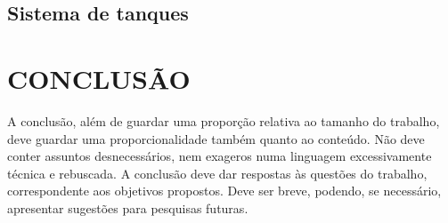 \documentclass[a4paper,12pt]{article}
\begin{document}

\newpage
\subsection{Sistema de tanques}

\newpage


\thispagestyle{main}

\section{CONCLUSÃO}


\hspace{4ex}A conclusão, além de guardar uma proporção relativa ao tamanho do trabalho,
deve guardar uma proporcionalidade também quanto ao conteúdo. Não deve conter
assuntos desnecessários, nem exageros numa linguagem excessivamente técnica e
rebuscada. A conclusão deve dar respostas às questões do trabalho, correspondente aos
objetivos propostos. Deve ser breve, podendo, se necessário, apresentar sugestões para
pesquisas futuras.

\newpage




\appendix


\end{document}
